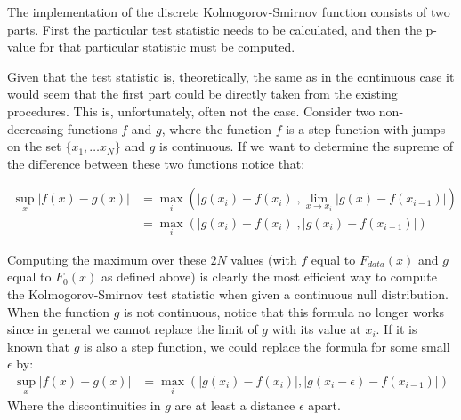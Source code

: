 \documentclass[article]{jss}
\begin{document}
The implementation of the discrete Kolmogorov-Smirnov function consists of two parts. First the particular test statistic needs to be calculated,
and then the p-value for that particular statistic must be computed. 

Given that the test statistic is, theoretically, the same as in the
continuous case it would seem that the first part could be directly taken from the existing procedures. This is, unfortunately, often not the case.
Consider two non-decreasing functions $f$ and $g$, where the function $f$ is a step function with jumps on the set $\{x_1, \ldots x_N \}$ and $g$
is continuous. If we want to determine the supreme of the difference between these two functions notice that:

\begin{align}
\sup_x \left| f(x)- g(x) \right| &= \max_i \left( \left|g(x_i) - f(x_i) \right|, \lim_{x \rightarrow x_i} \left| g(x) - f(x_{i-1}) \right| \right) \\
&=  \max_i \left( \left|g(x_i) - f(x_i) \right|, \left| g(x_i) - f(x_{i-1}) \right| \right)
\end{align}

Computing the maximum over these $2N$ values (with $f$ equal to $F_{data}(x)$ and $g$ equal to $F_0(x)$ as defined above) is clearly the 
most efficient way to compute the Kolmogorov-Smirnov test statistic when given a continuous null distribution. When the function $g$ is not
continuous, notice that this formula no longer works since in general we cannot replace the limit of $g$ with its value at $x_i$. If it is known that $g$
is also a step function, we could replace the formula for some small $\epsilon$ by:
\begin{align}
\sup_x \left| f(x)- g(x) \right| &=  \max_i \left( \left|g(x_i) - f(x_i) \right|, \left| g(x_i - \epsilon) - f(x_{i-1}) \right| \right)
\end{align}
Where the discontinuities in $g$ are at least a distance $\epsilon$ apart. 

\end{document}
